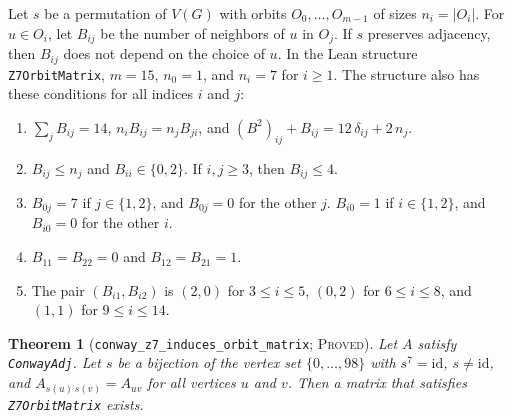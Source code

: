\documentclass[pdflatex,sn-mathphys-num]{sn-jnl}
\theoremstyle{thmstyleone}
\newtheorem{theorem}{Theorem}[section]
\theoremstyle{thmstyletwo}
\theoremstyle{thmstylethree}
\numberwithin{equation}{section}
\begin{document}
Let $s$ be a permutation of $V(G)$ with orbits $O_0, \dots, O_{m-1}$ of sizes $n_i = |O_i|$.
For $u \in O_i$, let $B_{ij}$ be the number of neighbors of $u$ in $O_j$.
If $s$ preserves adjacency, then $B_{ij}$ does not depend on the choice of $u$.
In the Lean structure \texttt{Z7OrbitMatrix}, $m = 15$, $n_0 = 1$, and $n_i = 7$ for $i \ge 1$.
The structure also has these conditions for all indices $i$ and $j$:
\begin{enumerate}
 \item $\sum_{j} B_{ij} = 14$, $n_i B_{ij} = n_j B_{ji}$, and $(B^2)_{ij} + B_{ij} = 12\,\delta_{ij} + 2\,n_j$.
 \item $B_{ij} \le n_j$ and $B_{ii} \in \{0, 2\}$. If $i, j \ge 3$, then $B_{ij} \le 4$.
 \item $B_{0j} = 7$ if $j \in \{1, 2\}$, and $B_{0j} = 0$ for the other $j$. $B_{i0} = 1$ if $i \in \{1, 2\}$, and $B_{i0} = 0$ for the other $i$.
 \item $B_{11} = B_{22} = 0$ and $B_{12} = B_{21} = 1$.
 \item The pair $(B_{i1}, B_{i2})$ is $(2, 0)$ for $3 \le i \le 5$, $(0, 2)$ for $6 \le i \le 8$, and $(1, 1)$ for $9 \le i \le 14$.
\end{enumerate}

\begin{theorem}[\texttt{conway\_z7\_induces\_orbit\_matrix}; \textsc{Proved}]
\label{thm:z7_reduction}
Let $A$ satisfy \texttt{ConwayAdj}. Let $s$ be a bijection of the vertex set $\{0, \dots, 98\}$ with $s^7 = \mathrm{id}$, $s \ne \mathrm{id}$, and $A_{s(u)\,s(v)} = A_{uv}$ for all vertices $u$ and $v$. Then a matrix that satisfies \texttt{Z7OrbitMatrix} exists.
\end{theorem}
\end{document}
